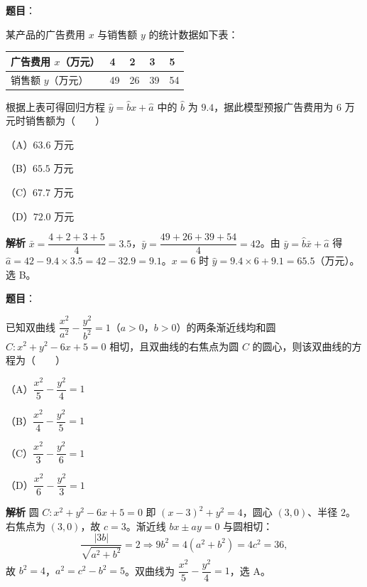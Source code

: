 \begin{answer}

\textbf{题目}：

某产品的广告费用 $x$ 与销售额 $y$ 的统计数据如下表：

\begin{center}
\begin{tabular}{lllll}
\toprule
广告费用 $x$（万元） & 4 & 2 & 3 & 5 \\
\midrule
销售额 $y$（万元） & 49 & 26 & 39 & 54 \\
\bottomrule
\end{tabular}
\end{center}

根据上表可得回归方程 $\hat y=\hat bx+\hat a$ 中的 $\hat b$ 为 $9.4$，据此模型预报广告费用为 $6$ 万元时销售额为\mbox{（　　）}

（A）$63.6$ 万元

（B）$65.5$ 万元

（C）$67.7$ 万元

（D）$72.0$ 万元

\textbf{解析}
$\bar x=\dfrac{4+2+3+5}{4}=3.5$，$\bar y=\dfrac{49+26+39+54}{4}=42$。由 $\bar y=\hat b\bar x+\hat a$ 得 $\hat a=42-9.4\times3.5=42-32.9=9.1$。$x=6$ 时 $\hat y=9.4\times6+9.1=65.5$（万元）。选 B。


\end{answer}
\begin{answer}

\textbf{题目}：

已知双曲线 $\dfrac{x^2}{a^2}-\dfrac{y^2}{b^2}=1$（$a>0$，$b>0$）的两条渐近线均和圆 $C:x^2+y^2-6x+5=0$ 相切，且双曲线的右焦点为圆 $C$ 的圆心，则该双曲线的方程为\mbox{（　　）}

（A）$\dfrac{x^2}{5}-\dfrac{y^2}{4}=1$

（B）$\dfrac{x^2}{4}-\dfrac{y^2}{5}=1$

（C）$\dfrac{x^2}{3}-\dfrac{y^2}{6}=1$

（D）$\dfrac{x^2}{6}-\dfrac{y^2}{3}=1$

\textbf{解析}
圆 $C:x^2+y^2-6x+5=0$ 即 $(x-3)^2+y^2=4$，圆心 $(3,0)$、半径 $2$。右焦点为 $(3,0)$，故 $c=3$。渐近线 $bx\pm ay=0$ 与圆相切：
\nopagebreak[4]
\[\frac{|3b|}{\sqrt{a^2+b^2}}=2\Longrightarrow 9b^2=4(a^2+b^2)=4c^2=36,\]
故 $b^2=4$，$a^2=c^2-b^2=5$。双曲线为 $\dfrac{x^2}{5}-\dfrac{y^2}{4}=1$，选 A。


\end{answer}
